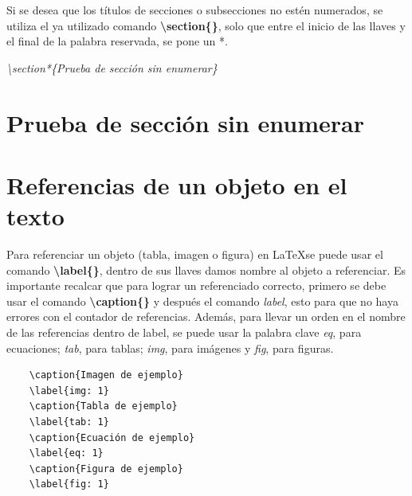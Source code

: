 Si se desea que los títulos de secciones o subsecciones no estén numerados, se utiliza el ya utilizado comando \textbf{\textbackslash{section}\{\}}, solo que entre el inicio de las llaves y el final de la palabra reservada, se pone un *.
\begin{center}
    \textit{\textbackslash{section*\{Prueba de sección sin enumerar\}}}
\end{center}

\section*{Prueba de sección sin enumerar}



\section{Referencias de un objeto en el texto}

Para referenciar un objeto (tabla, imagen o figura) en \LaTeX se puede usar el comando \textbf{\textbackslash{label\{\}}}, dentro de sus llaves damos nombre al objeto a referenciar. Es importante recalcar que para lograr un referenciado correcto, primero se debe usar el comando \textbf{\textbackslash{caption\{\}}} y después el comando \textit{label}, esto para que no haya errores con el contador de referencias. Además, para llevar un orden en el nombre de las referencias dentro de label, se puede usar la palabra clave \textit{eq}, para ecuaciones; \textit{tab}, para tablas; \textit{img}, para imágenes y \textit{fig}, para figuras.
\begin{lstlisting}
    \caption{Imagen de ejemplo}
    \label{img: 1}
    \caption{Tabla de ejemplo}
    \label{tab: 1}
    \caption{Ecuación de ejemplo}
    \label{eq: 1}
    \caption{Figura de ejemplo}
    \label{fig: 1}
\end{lstlisting}

